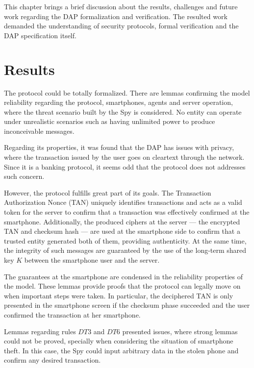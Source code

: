 \label{chap:conclusion}
This chapter brings a brief discussion about the results, challenges and future work regarding the DAP formalization and verification. The resulted work demanded the understanding of security protocols, formal verification and the DAP specification itself.


\section{Results}
The protocol could be totally formalized. There are lemmas confirming the model reliability regarding the protocol, smartphones, agents and server operation, where the threat scenario built by the Spy is considered. No entity can operate under unrealistic scenarios such as having unlimited power to produce inconceivable messages.

Regarding its properties, it was found that the DAP has issues with privacy, where the transaction issued by the user goes on cleartext through the network. Since it is a banking protocol, it seems odd that the protocol does not addresses such concern.

However, the protocol fulfills great part of its goals. The Transaction Authorization Nonce (TAN) uniquely identifies transactions and acts as a valid token for the server to confirm that a transaction was effectively confirmed at the smartphone. Additionally, the produced ciphers at the server --- the encrypted TAN and checksum hash --- are used at the smartphone side to confirm that a trusted entity generated both of them, providing authenticity. At the same time, the integrity of such messages are guaranteed by the use of the long-term shared key \(K\) between the smartphone user and the server.

The guarantees at the smartphone are condensed in the reliability properties of the model. These lemmas provide proofs that the protocol can legally move on when important steps were taken. In particular, the deciphered TAN is only presented in the smartphone screen if the checksum phase succeeded and the user confirmed the transaction at her smartphone.

Lemmas regarding rules $DT3$ and $DT6$ presented issues, where strong lemmas could not be proved, specially when considering the situation of smartphone theft. In this case, the Spy could input arbitrary data in the stolen phone and confirm any desired transaction.


